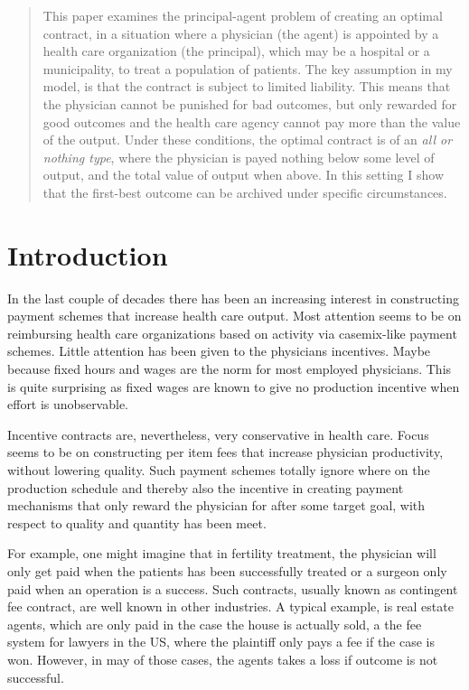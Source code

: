 


\maketitle
\begin{abstract}
This paper examines the principal-agent problem of creating an optimal contract, in a situation where a physician (the agent) is appointed by a health care organization (the principal), which may be a hospital or a municipality, to treat a population of patients. The key assumption in my model, is that the contract is subject to limited liability. This means that the physician cannot be punished for bad outcomes, but only rewarded for good outcomes and the health care agency cannot pay more than the value of the output. Under these conditions, the optimal contract is of an \emph{all or nothing type}, where the physician is payed nothing below some level of output,  and the total value of output when above. In this setting I show that the first-best outcome can be archived under specific circumstances. 


\end{abstract}

\section{Introduction} %
\label{sec:introduction}
In the last couple of decades there has been an increasing interest in constructing payment schemes that increase health care output. Most attention seems to be on reimbursing health care organizations based on activity via casemix-like payment schemes. Little attention has been given to the physicians incentives. Maybe because fixed hours and wages are the norm for most employed physicians. This is quite surprising as fixed wages are known to give no production incentive when effort is unobservable.  

Incentive contracts are, nevertheless, very conservative in health care. Focus seems to be on constructing per item fees that increase physician productivity, without lowering quality. Such payment schemes totally ignore where on the production schedule and thereby also the incentive in creating payment mechanisms that only reward the physician for after some target goal, with respect to quality and quantity has been meet. 

For example, one might imagine that in fertility treatment, the physician will only get paid when the patients has been successfully treated or a surgeon only paid when an operation is a success. Such contracts, usually known as contingent fee contract, are well known in other industries. A typical example, is real estate agents, which are only paid in the case the house is actually sold, a the fee system for lawyers in the US, where the plaintiff only pays a fee if the case is won. However, in may of those cases, the agents takes a loss if outcome is not successful.

